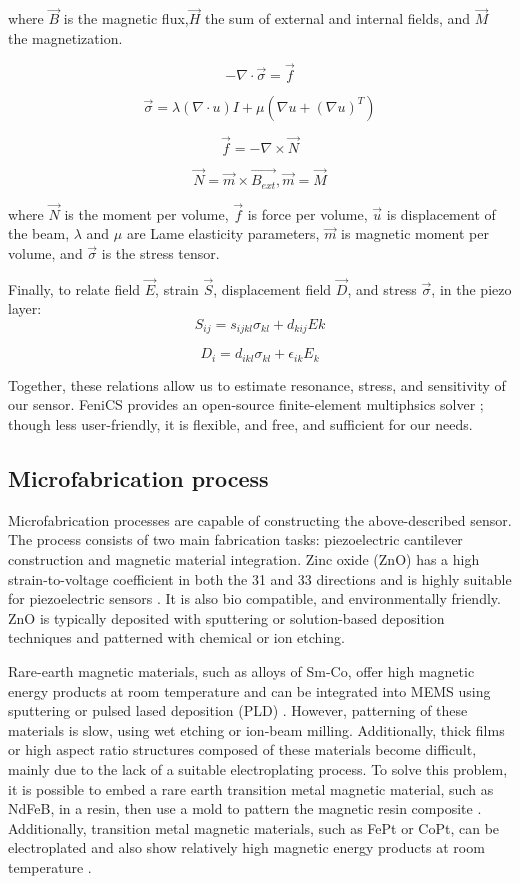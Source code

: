 where $\vec{B}$ is the magnetic flux,$\vec{H}$ the sum of external and internal fields, and $\vec{M}$ the magnetization.
 
 $$ -\nabla\cdot\vec{\sigma}=\vec{f}$$
 
 $$ \vec{\sigma} = \lambda(\nabla\cdot u)I+\mu(\nabla u +(\nabla u)^T)$$

 $$ \vec{f} = -\nabla\times\vec{N}$$
 
$$ \vec{N} = \vec{m} \times \vec{B_{ext}}, \vec{m} = \vec{M} $$

where $\vec{N}$ is the moment per volume, $\vec{f}$ is force per volume, $\vec{u}$ is displacement of the beam, $\lambda$ and $\mu$ are Lame elasticity parameters, $\vec{m}$ is magnetic moment per volume, and $\vec{\sigma}$ is the stress tensor.

Finally, to relate field $\vec{E}$, strain $\vec{S}$, displacement field $\vec{D}$, and stress $\vec{\sigma}$, in the piezo layer:
 $$S_{ij} = s_{ijkl}\sigma_{kl}+d_{kij}E{k}$$

$$D_i=d_{ikl}\sigma_{kl}+\epsilon_{ik}E_{k}$$
 
Together, these relations allow us to estimate resonance, stress, and sensitivity of our sensor. FeniCS provides an open-source finite-element multiphsics solver \cite{dupont2003fenics}; though less user-friendly, it is flexible, and free, and sufficient for our needs.


\subsection{Microfabrication process}
Microfabrication processes are capable of constructing the above-described sensor. The process consists of two main fabrication tasks: piezoelectric cantilever construction and magnetic material integration. Zinc oxide (ZnO) has a high strain-to-voltage coefficient in both the 31 and 33 directions and is highly suitable for piezoelectric sensors \cite{tadigadapa2009piezoelectric}. It is also bio compatible, and environmentally friendly. ZnO is typically deposited with sputtering or solution-based deposition techniques \cite{znaidi2010sol} and patterned with chemical or ion etching.

Rare-earth magnetic materials, such as alloys of Sm-Co, offer high magnetic energy products at room temperature and can be integrated into MEMS using sputtering or pulsed lased deposition (PLD)  \cite{arnold2009permanent}. However, patterning of these materials is slow, using wet etching or ion-beam milling. Additionally, thick films or high aspect ratio structures composed of these materials become difficult, mainly due to the lack of a suitable electroplating process. To solve this problem, it is possible to embed a rare earth transition metal magnetic material, such as NdFeB, in a resin, then use a mold to pattern the magnetic resin composite \cite{wang2013resin}. Additionally, transition metal magnetic materials, such as FePt or CoPt, can be electroplated and also show relatively high magnetic energy products at room temperature \cite{arnold2009permanent,chin2000permanent}.



